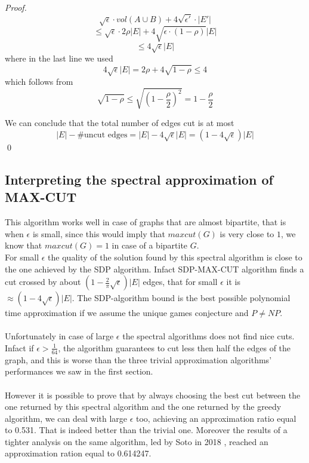 \begin{lemma}
\begin{proof}
\[ \sqrt{\epsilon} \cdot vol(A \cup B) + 4\sqrt{\epsilon'} \cdot |E'| \]
\[ \leq \sqrt{\epsilon} \cdot 2\rho|E| + 4\sqrt{\epsilon \cdot (1 - \rho)} |E| \]
\[\leq 4\sqrt{\epsilon} |E| \]
where in the last line we used
\[  4\sqrt{\epsilon}|E| =  2 \rho + 4 \sqrt{1- \rho} \leq 4 \]
which follows from
\[ \sqrt{1- \rho} \leq \sqrt{(1- \frac{\rho}{2})^2} = 1- \frac{\rho}{2} \]

We can conclude that the total number of edges cut is at most 
\[ |E| - \#\text{uncut edges} = |E|- 4\sqrt{\epsilon}|E| = (1 - 4\sqrt{\epsilon})|E|  \]
\qed
\end{proof}
\end{lemma}

\subsection{Interpreting the spectral approximation of MAX-CUT}
This algorithm works well in case of graphs that are almost bipartite, that is when $ \epsilon $ is small, since this would imply that $ maxcut(G) $ is very close to $ 1 $, we know that $ maxcut(G) =1$ in case of a bipartite $ G $.\\
For small $ \epsilon $ the quality of the solution found by this spectral algorithm is close to the one achieved by the SDP algorithm. Infact SDP-MAX-CUT algorithm finds a cut crossed by about $ (1- \frac{2}{\pi}\sqrt{\epsilon})|E|  $ edges, that for small $ \epsilon $ it is $ \approx (1-4\sqrt{\epsilon})|E|$. The SDP-algorithm bound is the best possible polynomial time approximation if we assume the unique games conjecture and $ P \ne NP $.
\\
\\
Unfortunately in case of large $ \epsilon $ the spectral algorithms does not find nice cuts. \\
Infact if $ \epsilon > \frac{1}{64} $, the algorithm guarantees to cut less then half the edges of the graph, and this is worse than the three trivial approximation algorithms' performances we saw in the first section.
\\
\\
However it is possible to prove that by always choosing the best cut between the one returned by this spectral algorithm and the one returned by the greedy algorithm, we can deal with large $ \epsilon $ too, achieving an approximation ratio equal to 0.531. That is indeed better than the trivial one.
Moreover the results of a tighter analysis on the same algorithm, led by Soto in 2018 \cite{soto-improv}, reached an approximation ration equal to 0.614247.
